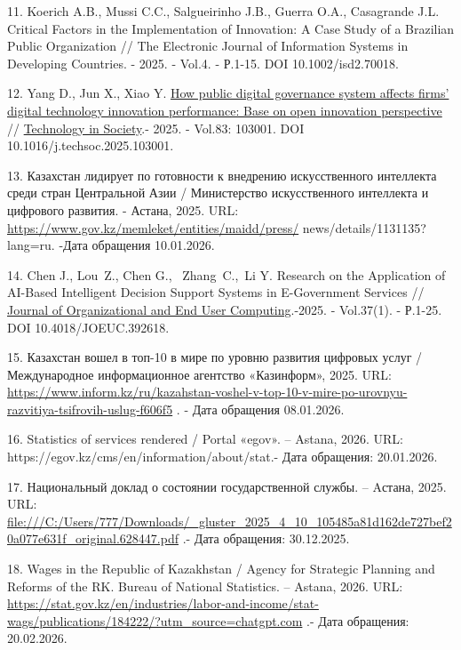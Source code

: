 \begin{refs}
11. Koerich A.B., Mussi C.C., Salgueirinho J.B., Guerra O.A., Casagrande
J.L. Critical Factors in the Implementation of Innovation: A Case
Study of a Brazilian Public Organization // The Electronic Journal of
Information Systems in Developing Countries. - 2025. - Vol.4. -
Р.1-15. DOI 10.1002/isd2.70018.

12. Yang D., Jun X., Xiao Y.
\href{https://ideas.repec.org/a/eee/teinso/v83y2025ics0160791x25001915.html}{How
public digital governance system affects firms'{}
digital technology innovation performance: Base on open innovation
perspective} //
\href{https://ideas.repec.org/s/eee/teinso.html}{Technology in
Society}.- 2025. - Vol.83: 103001. DOI 10.1016/j.techsoc.2025.103001.

13. Казахстан лидирует по готовности к внедрению искусственного интеллекта
среди стран Центральной Азии / Министерство искусственного интеллекта
и цифрового развития. - Астана, 2025. URL:
\url{https://www.gov.kz/memleket/entities/maidd/press/}
news/details/1131135?lang=ru. -Дата обращения 10.01.2026.

14. Chen J., Lou~Z., Chen G.,~ Zhang~C.,~Li Y. Research on the Application
of AI-Based Intelligent Decision Support Systems in E-Government
Services //
\href{https://www.sciencedirect.com/org/journal/journal-of-organizational-and-end-user-computing}{Journal
of Organizational and End User Computing}.-2025. - Vol.37(1). -
Р.1-25. DOI 10.4018/JOEUC.392618.

15. Казахстан вошел в топ-10 в мире по уровню развития цифровых услуг /
Международное информационное агентство «Казинформ», 2025. URL:
\url{https://www.inform.kz/ru/kazahstan-voshel-v-top-10-v-mire-po-urovnyu-razvitiya-tsifrovih-uslug-f606f5}
. - Дата обращения 08.01.2026.

16. Statistics of services rendered / Portal «egov». -- Astana, 2026. URL:
https://egov.kz/cms/en/information/about/stat.- Дата обращения:
20.01.2026.

17. Национальный доклад о состоянии государственной службы. -- Aстана,
2025. URL:
\url{file:///C:/Users/777/Downloads/_gluster_2025_4_10_105485a81d162de727bef20a077e631f_original.628447.pdf}
.- Дата обращения: 30.12.2025.

18. Wages in the Republic of Kazakhstan / Agency for Strategic Planning
and Reforms of the RK. Bureau of National Statistics. -- Astana, 2026.
URL:
\url{https://stat.gov.kz/en/industries/labor-and-income/stat-wags/publications/184222/?utm_source=chatgpt.com}
.- Дата обращения: 20.02.2026.


\end{refs}
